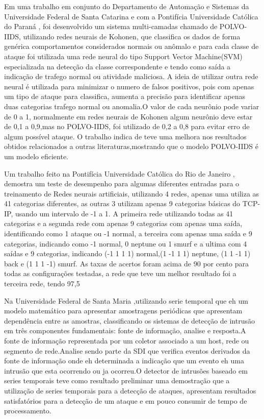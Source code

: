 \documentclass[
	12pt,				%
	openright,			%
	oneside,
	a4paper,			%
	english,			%
	french,				%
	spanish,			%
	brazil				%
	]{abntex2}
\begin{document}
Em uma trabalho em conjunto do Departamento de Automação e Sistemas da Universidade Federal de Santa Catarina \cite{polvo1} e com a Pontifícia Universidade Católica do Paraná \cite{polvo2}, foi desenvolvido um sistema multi-camadas chamado de POLVO-IIDS, utilizando redes neurais de Kohonen, que classifica os dados de forma
genérica comportamentos considerados normais ou anômalo e para cada classe de ataque foi utilizada uma rede neural do tipo Support Vector Machine(SVM) especializada na detecção da classe correspondente e tendo como saída a indicação de trafego normal ou atividade maliciosa.
A ideia de utilizar outra rede neural é utilizada para minimizar o numero de falsos positivos, pois com apenas um tipo de ataque para classifica, aumenta a precisão para identificar apenas duas categorias trafego normal ou anomalia.O valor de cada neurônio pode variar de 0 a 1, normalmente em redes neurais de Kohonen algum neurônio deve estar de 0,1 a 0,9,mas no POLVO-IIDS, foi utilizado de 0,2 a 0,8 para evitar erro de algum possível ataque. O trabalho indica de teve uma melhora nos resultados obtidos relacionados a outras literaturas,mostrando que o modelo POLVO-IIDS é um modelo eficiente.

Um trabalho feito na Pontifícia Universidade Católica do Rio de Janeiro \cite{RenatoMaia}, demostra um teste de desempenho para algumas diferentes entradas para o treinamento de Redes neurais artificiais,
utilizando 4 redes, apenas uma utiliza as 41 categorias diferentes, as outras 3 utilizam apenas 9 categorias básicas do TCP-IP, usando um intervalo de -1 a 1. A primeira rede utilizando todas as 41 categorias e a segunda rede com apenas 9 categorias com apenas uma saída, identificando como 1 ataque ou -1 normal, a terceira com apenas uma saída e 9 categorias, indicando como -1 normal, 0 neptune ou 1 smurf e a ultima com 4 saídas e 9 categorias, indicando (-1 1 1 1) normal,(1 -1 1 1) neptune, (1 1 -1 1) back e (1 1 1 -1) smurf. As taxas de acertos foram acima de 90 por cento para todas as configurações testadas, a rede que teve um melhor resultado foi a terceira rede, tendo 97,5%


Na Universidade Federal de Santa Maria \cite{Dalmazo},utilizando serie temporal que eh um modelo matemático para apresentar amostragens periódicas que apresentam dependência entre as amostras, classificando os sistemas de detecção de intrusão em três componentes fundamentais: fonte de informação, analise e resposta.A fonte de informação representada por um coletor associado a um host, rede ou segmento de rede.Analise sendo parte da SDI que verifica eventos derivados da fonte de informação onde eh determinada a indicação que um evento eh uma intrusão que esta ocorrendo ou ja ocorreu.O detector de intrusões baseado em series temporais teve como resultado preliminar uma demostração que a utilização de series temporais para a detecção de ataques, apresentam resultados satisfatórios para a detecção de um ataque e em pouco consumir de tempo de processamento.
\end{document}

